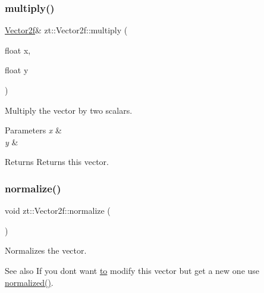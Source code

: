\subsubsection{\texorpdfstring{multiply()}{multiply()}\hspace{0.1cm}{\footnotesize\ttfamily [2/2]}}
{\footnotesize\ttfamily \hyperlink{classzt_1_1_vector2f}{Vector2f}\& zt\+::\+Vector2f\+::multiply (\begin{DoxyParamCaption}\item[{float}]{x,  }\item[{float}]{y }\end{DoxyParamCaption})}



Multiply the vector by two scalars. 


\begin{DoxyParams}{Parameters}
{\em x} & \\
\hline
{\em y} & \\
\hline
\end{DoxyParams}
\begin{DoxyReturn}{Returns}
Returns this vector. 
\end{DoxyReturn}
\mbox{\label{classzt_1_1_vector2f_a2992fead31cd872fbb7d2bda8271cdad}} 
\subsubsection{\texorpdfstring{normalize()}{normalize()}}
{\footnotesize\ttfamily void zt\+::\+Vector2f\+::normalize (\begin{DoxyParamCaption}{ }\end{DoxyParamCaption})}



Normalizes the vector. 

\begin{DoxySeeAlso}{See also}
If you don\textquotesingle{}t want \hyperlink{classzt_1_1_vector2f_a2aa1ef32f78d6399891f6318e9a0cd3c}{to} modify this vector but get a new one use \hyperlink{classzt_1_1_vector2f_a46f3e0b08f9ea3c9ec0f1c0670f82ebc}{normalized()}. 
\end{DoxySeeAlso}
\mbox{\label{classzt_1_1_vector2f_a46f3e0b08f9ea3c9ec0f1c0670f82ebc}} 
